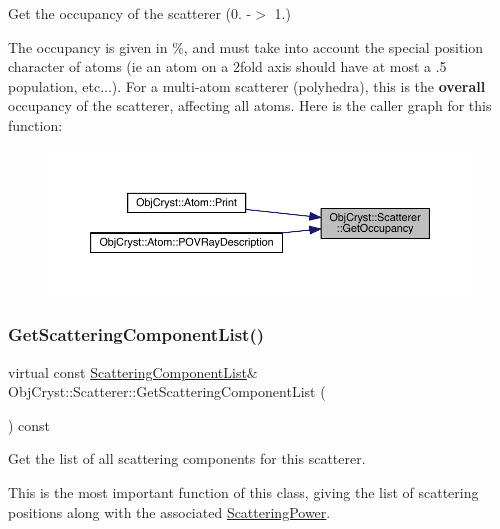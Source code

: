 Get the occupancy of the scatterer (0. -\/$>$ 1.) 

The occupancy is given in \%, and must take into account the \textquotesingle{}special position\textquotesingle{} character of atoms (ie an atom on a 2fold axis should have at most a .5 population, etc...). For a multi-\/atom scatterer (polyhedra), this is the {\bfseries{overall}} occupancy of the scatterer, affecting all atoms. Here is the caller graph for this function\+:
\nopagebreak
\begin{figure}[H]
\begin{center}
\leavevmode
\includegraphics[width=350pt]{class_obj_cryst_1_1_scatterer_a6c063b27354d3885006a118de9816d69_icgraph}
\end{center}
\end{figure}
\mbox{\label{class_obj_cryst_1_1_scatterer_aca0e08e3793cc69d31fce53e481c2a67}} 
\subsubsection{\texorpdfstring{GetScatteringComponentList()}{GetScatteringComponentList()}}
{\footnotesize\ttfamily virtual const \mbox{\hyperlink{class_obj_cryst_1_1_scattering_component_list}{Scattering\+Component\+List}}\& Obj\+Cryst\+::\+Scatterer\+::\+Get\+Scattering\+Component\+List (\begin{DoxyParamCaption}{ }\end{DoxyParamCaption}) const\hspace{0.3cm}{\ttfamily [pure virtual]}}



Get the list of all scattering components for this scatterer. 

This is the most important function of this class, giving the list of scattering positions along with the associated \mbox{\hyperlink{class_obj_cryst_1_1_scattering_power}{Scattering\+Power}}. 

